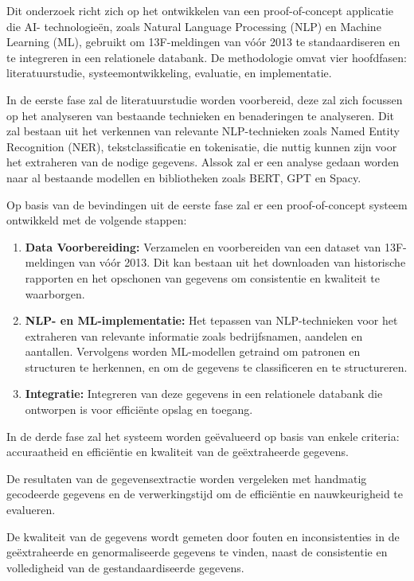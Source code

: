 Dit onderzoek richt zich op het ontwikkelen van een proof-of-concept applicatie die AI- technologieën, zoals Natural Language Processing (NLP) en Machine Learning (ML), gebruikt om 13F-meldingen van vóór 2013 te standaardiseren en te integreren in een relationele databank. De methodologie omvat vier hoofdfasen: literatuurstudie, systeemontwikkeling, evaluatie, en implementatie.

In de eerste fase zal de literatuurstudie worden voorbereid, deze zal zich focussen op het analyseren van bestaande technieken en benaderingen te analyseren. Dit zal bestaan uit het verkennen van relevante NLP-technieken zoals Named Entity Recognition (NER), tekstclassificatie en tokenisatie, die nuttig kunnen zijn voor het extraheren van de nodige gegevens. Alssok zal er een analyse gedaan worden naar al bestaande modellen en bibliotheken zoals BERT, GPT en Spacy.

Op basis van de bevindingen uit de eerste fase zal er een proof-of-concept systeem ontwikkeld met de volgende stappen:
\begin{enumerate}
    \item \textbf{Data Voorbereiding:} Verzamelen en voorbereiden van een dataset van 13F-meldingen van vóór 2013. Dit kan bestaan uit het downloaden van historische rapporten en het opschonen van gegevens om consistentie en kwaliteit te waarborgen.
    \item \textbf{NLP- en ML-implementatie:} Het tepassen van NLP-technieken voor het extraheren van relevante informatie zoals bedrijfsnamen, aandelen en aantallen. Vervolgens worden ML-modellen getraind om patronen en structuren te herkennen, en om de gegevens te classificeren en te structureren.
    \item \textbf{Integratie:} Integreren van deze gegevens in een relationele databank die ontworpen is voor efficiënte opslag en toegang.
\end{enumerate}

In de derde fase zal het systeem worden geëvalueerd op basis van enkele criteria: accuraatheid en efficiëntie en kwaliteit van de geëxtraheerde gegevens.

De resultaten van de gegevensextractie worden vergeleken met handmatig gecodeerde gegevens en de verwerkingstijd om de efficiëntie en nauwkeurigheid te evalueren. 

De kwaliteit van de gegevens wordt gemeten door fouten en inconsistenties in de geëxtraheerde en genormaliseerde gegevens te vinden, naast de consistentie en volledigheid van de gestandaardiseerde gegevens.


